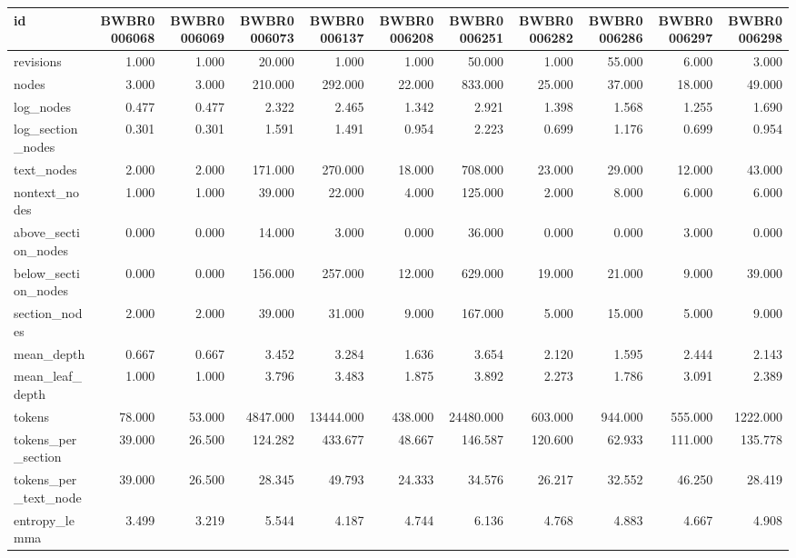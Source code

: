 \begin{tabular}{lrrrrrrrrrr}
\toprule
id & BWBR0006068 & BWBR0006069 & BWBR0006073 & BWBR0006137 & BWBR0006208 & BWBR0006251 & BWBR0006282 & BWBR0006286 & BWBR0006297 & BWBR0006298 \\
\midrule
revisions & 1.000 & 1.000 & 20.000 & 1.000 & 1.000 & 50.000 & 1.000 & 55.000 & 6.000 & 3.000 \\
\cline{1-11}
nodes & 3.000 & 3.000 & 210.000 & 292.000 & 22.000 & 833.000 & 25.000 & 37.000 & 18.000 & 49.000 \\
\cline{1-11}
log\_nodes & 0.477 & 0.477 & 2.322 & 2.465 & 1.342 & 2.921 & 1.398 & 1.568 & 1.255 & 1.690 \\
\cline{1-11}
log\_section\_nodes & 0.301 & 0.301 & 1.591 & 1.491 & 0.954 & 2.223 & 0.699 & 1.176 & 0.699 & 0.954 \\
\cline{1-11}
text\_nodes & 2.000 & 2.000 & 171.000 & 270.000 & 18.000 & 708.000 & 23.000 & 29.000 & 12.000 & 43.000 \\
\cline{1-11}
nontext\_nodes & 1.000 & 1.000 & 39.000 & 22.000 & 4.000 & 125.000 & 2.000 & 8.000 & 6.000 & 6.000 \\
\cline{1-11}
above\_section\_nodes & 0.000 & 0.000 & 14.000 & 3.000 & 0.000 & 36.000 & 0.000 & 0.000 & 3.000 & 0.000 \\
\cline{1-11}
below\_section\_nodes & 0.000 & 0.000 & 156.000 & 257.000 & 12.000 & 629.000 & 19.000 & 21.000 & 9.000 & 39.000 \\
\cline{1-11}
section\_nodes & 2.000 & 2.000 & 39.000 & 31.000 & 9.000 & 167.000 & 5.000 & 15.000 & 5.000 & 9.000 \\
\cline{1-11}
mean\_depth & 0.667 & 0.667 & 3.452 & 3.284 & 1.636 & 3.654 & 2.120 & 1.595 & 2.444 & 2.143 \\
\cline{1-11}
mean\_leaf\_depth & 1.000 & 1.000 & 3.796 & 3.483 & 1.875 & 3.892 & 2.273 & 1.786 & 3.091 & 2.389 \\
\cline{1-11}
tokens & 78.000 & 53.000 & 4847.000 & 13444.000 & 438.000 & 24480.000 & 603.000 & 944.000 & 555.000 & 1222.000 \\
\cline{1-11}
tokens\_per\_section & 39.000 & 26.500 & 124.282 & 433.677 & 48.667 & 146.587 & 120.600 & 62.933 & 111.000 & 135.778 \\
\cline{1-11}
tokens\_per\_text\_node & 39.000 & 26.500 & 28.345 & 49.793 & 24.333 & 34.576 & 26.217 & 32.552 & 46.250 & 28.419 \\
\cline{1-11}
entropy\_lemma & 3.499 & 3.219 & 5.544 & 4.187 & 4.744 & 6.136 & 4.768 & 4.883 & 4.667 & 4.908 \\

\end{tabular}
